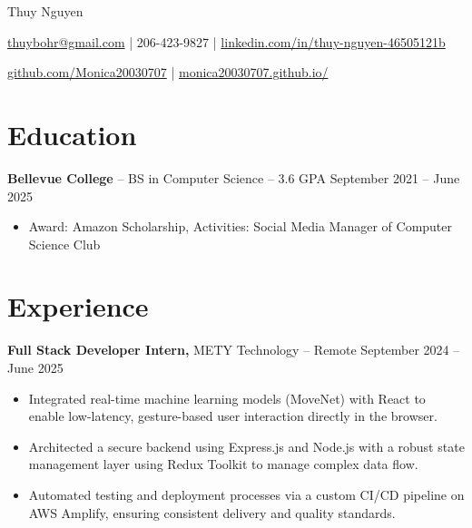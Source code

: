 \documentclass[11pt]{article}       %
\begin{document}
\centerline{\Huge Thuy Nguyen}

\vspace{5pt}

\centerline{\href{mailto:thuybohr@gmail.com}{thuybohr@gmail.com} | 206-423-9827 |
\href{https://www.linkedin.com/in/thuy-nguyen-46505121b/}{linkedin.com/in/thuy-nguyen-46505121b}}

\centerline{\href{https://github.com/Monica20030707}{github.com/Monica20030707} | 
\href{https://monica20030707.github.io/}{monica20030707.github.io/}} 

\vspace{-9pt}

\section*{Education}
\textbf{Bellevue College} -- BS in Computer Science -- 3.6 GPA \hfill September 2021 -- June 2025\\
\vspace{-9pt}
\begin{itemize}
  \item Award: Amazon Scholarship, Activities: Social Media Manager of Computer Science Club
\end{itemize}

\vspace{-18.5pt}

\section*{Experience}

\textbf{Full Stack Developer Intern,} {METY Technology} -- Remote \hfill September 2024 -- June 2025 \\
\vspace{-9pt}
\begin{itemize}
  \item Integrated real-time machine learning models (MoveNet) with React to enable low-latency, gesture-based user interaction directly in the browser.
  \item Architected a secure backend using Express.js and Node.js with a robust state management layer using Redux Toolkit to manage complex data flow.
  \item Automated testing and deployment processes via a custom CI/CD pipeline on AWS Amplify, ensuring consistent delivery and quality standards.
\end{itemize}
\end{document}
